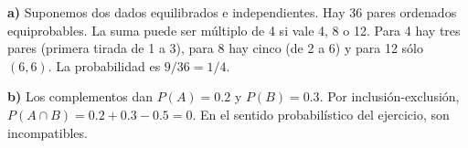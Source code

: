 \textbf{a)} Suponemos dos dados equilibrados e independientes.
Hay 36 pares ordenados equiprobables. La suma puede ser
múltiplo de 4 si vale 4, 8 o 12. Para 4 hay tres pares
(primera tirada de 1 a 3), para 8 hay cinco (de 2 a 6)
y para 12 sólo $(6,6)$. La probabilidad es $\boxed{9/36=1/4}$.

\textbf{b)} Los complementos dan $P(A)=0.2$ y $P(B)=0.3$.
Por inclusión-exclusión,
$P(A\cap B)=0.2+0.3-0.5=0$.
En el sentido probabilístico del ejercicio, son incompatibles.
